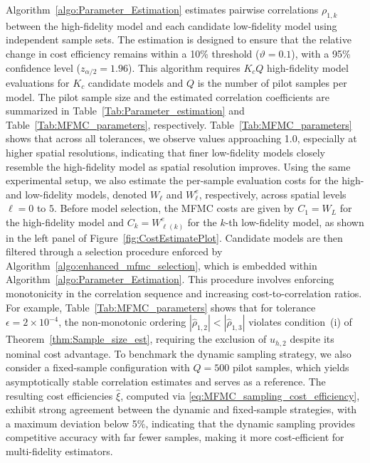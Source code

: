 Algorithm~\ref{algo:Parameter_Estimation} estimates pairwise correlations $\rho_{1,k}$ between the high-fidelity model and each candidate low-fidelity model using independent sample sets. The estimation is designed to ensure that the relative change in cost efficiency remains within a 10\% threshold ($\vartheta = 0.1$), with a 95\% confidence level ($z_{\alpha/2} = 1.96$). This algorithm requires $K_cQ$ high-fidelity model evaluations for $K_c$ candidate models and $Q$ is the number of pilot samples per model. The pilot sample size and the estimated correlation coefficients are summarized in Table~\ref{Tab:Parameter_estimation} and Table~\ref{Tab:MFMC_parameters}, respectively. Table~\ref{Tab:MFMC_parameters} shows that across all tolerances, we observe values approaching 1.0, especially at higher spatial resolutions, indicating that finer low-fidelity models closely resemble the high-fidelity model as spatial resolution improves. Using the same experimental setup, we also estimate the per-sample evaluation costs for the high- and low-fidelity models, denoted $W_\ell$ and $W_\ell^e$, respectively, across spatial levels $\ell = 0$ to $5$. Before model selection, the MFMC costs are given by $C_1 = W_L$ for the high-fidelity model and $C_k = W_{\ell(k)}^e$ for the $k$-th low-fidelity model, as shown in the left panel of Figure~\ref{fig:CostEstimatePlot}. Candidate models are then filtered through a selection procedure enforced by Algorithm~\ref{algo:enhanced_mfmc_selection}, which is embedded within Algorithm~\ref{algo:Parameter_Estimation}. This procedure involves enforcing monotonicity in the correlation sequence and increasing cost-to-correlation ratios. For example, Table~\ref{Tab:MFMC_parameters} shows that for tolerance $\epsilon = 2\times 10^{-4}$, the non-monotonic ordering $|\widehat \rho_{1,2}| < |\widehat \rho_{1,3}|$ violates condition~(i) of Theorem~\ref{thm:Sample_size_est}, requiring the exclusion of $u_{h,2}$ despite its nominal cost advantage. To benchmark the dynamic sampling strategy, we also consider a fixed-sample configuration with $Q = 500$ pilot samples, which yields asymptotically stable correlation estimates and serves as a reference. The resulting cost efficiencies $\widehat \xi$, computed via \eqref{eq:MFMC_sampling_cost_efficiency}, exhibit strong agreement between the dynamic and fixed-sample strategies, with a maximum deviation below 5\%, indicating that the dynamic sampling provides competitive accuracy with far fewer samples, making it more cost-efficient for multi-fidelity estimators.


